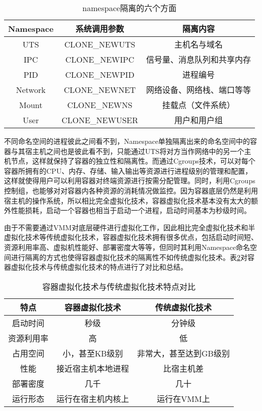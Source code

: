\begin{table}[!htbp]
    \centering
    \caption{namespace隔离的六个方面}\label{tab:namespace_system}
    \renewcommand\arraystretch{1.5} 
\begin{tabular}{*{3}{c}}
    \hline
    Namespace & 系统调用参数& 隔离内容\\
    \hline
    UTS & CLONE\_NEWUTS & 主机名与域名 \\
    IPC	& CLONE\_NEWIPC & 信号量、消息队列和共享内存\\
    PID & CLONE\_NEWPID & 进程编号\\
    Network & CLONE\_NEWNET & 网络设备、网络栈、端口等等 \\
    Mount & CLONE\_NEWNS & 挂载点（文件系统）\\
    User & CLONE\_NEWUSER & 用户和用户组\\
    \hline
   \end{tabular}
\end{table}

不同命名空间的进程彼此之间看不到，Namespace单独隔离出来的命名空间中的容器与其宿主机之间也是彼此看不到，只能通过UTS将对方当作网络中的另一个主机节点，这样就保持了容器的独立性和隔离性。而通过Cgroups技术，可以对每个容器所拥有的CPU、内存、存储、输入输出等资源进行进程级别的管理和配置，这样就使得用户可以利用容器对终端资源进行按需分配管理。同时，利用Cgroups控制组，也能够对对容器内各种资源的消耗情况做监控。因为容器底层仍然是利用宿主机的操作系统，所以相比完全虚拟化技术，容器虚拟化技术基本没有太大的额外性能损耗，启动一个容器也相当于启动一个进程，启动时间基本为秒级时间。

由于不需要通过VMM对底层硬件进行虚拟化工作，因此相比完全虚拟化技术和半虚拟化技术等传统虚拟化技术，容器虚拟化技术拥有很多优点，包括启动时间短、资源利用率高、虚拟机性能好、部署密度大等等，但同时其利用Namespace命名空间进行隔离的方式也使得容器虚拟化技术的隔离性不如传统虚拟化技术。表\ref{tab:compare_container_virtualization}对容器虚拟化技术与传统虚拟化技术的特点进行了对比和总结\cite{2019操作系统虚拟化的研究现状与展望}。

\begin{table}[!htbp]
    \centering
    \caption{容器虚拟化技术与传统虚拟化技术特点对比}\label{tab:compare_container_virtualization}
    \renewcommand\arraystretch{1.5} 
\begin{tabular}{*{3}{c}}
    \hline
    特点& 容器虚拟化技术& 传统虚拟化技术\\
    \hline
    启动时间& 秒级& 分钟级 \\
    资源利用率 &高& 低 \\
    占用空间 &小，甚至KB级别& 非常大，甚至达到GB级别 \\
    性能 &接近宿主机本地进程& 比宿主机差 \\
    部署密度 &几千& 几十 \\
    运行形态 &运行在宿主机内核上& 运行在VMM上 \\
    \hline
   
   \end{tabular}
\end{table}

